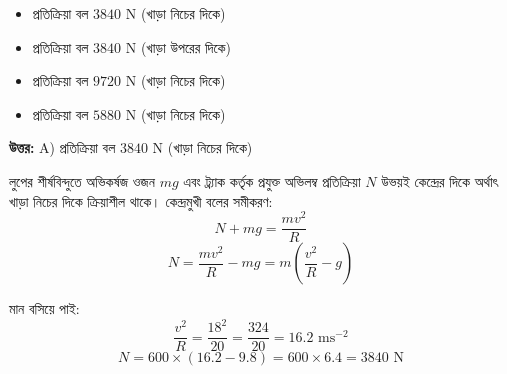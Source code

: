 \documentclass[12pt, a4paper]{article}
\begin{document}
{\begin{center}
\end{center}
\vspace{1em}

\begin{itemize}[label={}, leftmargin=1cm, itemsep=0.5em]
\item[\textbf{A)}] প্রতিক্রিয়া বল $3840\text{ N}$ (খাড়া নিচের দিকে)
\item[\textbf{B)}] প্রতিক্রিয়া বল $3840\text{ N}$ (খাড়া উপরের দিকে)
\item[\textbf{C)}] প্রতিক্রিয়া বল $9720\text{ N}$ (খাড়া নিচের দিকে)
\item[\textbf{D)}] প্রতিক্রিয়া বল $5880\text{ N}$ (খাড়া নিচের দিকে)
\end{itemize}

\vspace{0.5em}
\begin{tcolorbox}[answerbox]
\textbf{\color{success} উত্তর:} A) প্রতিক্রিয়া বল $3840\text{ N}$ (খাড়া নিচের দিকে)
\end{tcolorbox}
\vspace{1em}

\begin{tcolorbox}[solutionbox={সমাধান (Solution)}]
\noindent
লুপের শীর্ষবিন্দুতে অভিকর্ষজ ওজন $mg$ এবং ট্র্যাক কর্তৃক প্রযুক্ত অভিলম্ব প্রতিক্রিয়া $N$ উভয়ই কেন্দ্রের দিকে অর্থাৎ খাড়া নিচের দিকে ক্রিয়াশীল থাকে। 
কেন্দ্রমুখী বলের সমীকরণ:
\[ N + mg = \frac{m v^2}{R} \]
\[ N = \frac{m v^2}{R} - mg = m \left(\frac{v^2}{R} - g\right) \]

মান বসিয়ে পাই:
\[ \frac{v^2}{R} = \frac{18^2}{20} = \frac{324}{20} = 16.2\text{ ms}^{-2} \]
\[ N = 600 \times (16.2 - 9.8) = 600 \times 6.4 = 3840\text{ N} \]


\end{tcolorbox}}
\end{document}
